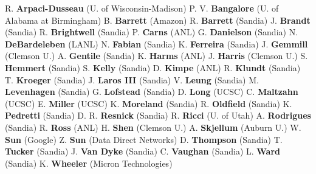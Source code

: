 R. \textbf{Arpaci-Dusseau} (U. of Wisconsin-Madison)
P. V. \textbf{Bangalore} (U. of Alabama at Birmingham)
B. \textbf{Barrett} (Amazon)
R. \textbf{Barrett} (Sandia)
J. \textbf{Brandt} (Sandia)
R. \textbf{Brightwell} (Sandia)
P. \textbf{Carns} (ANL)
G. \textbf{Danielson} (Sandia)
N. \textbf{DeBardeleben} (LANL)
N. \textbf{Fabian} (Sandia)
K. \textbf{Ferreira} (Sandia)
J. \textbf{Gemmill} (Clemson U.)
A. \textbf{Gentile} (Sandia)
K. \textbf{Harms} (ANL)
J. \textbf{Harris} (Clemson U.)
S. \textbf{Hemmert} (Sandia)
S. \textbf{Kelly} (Sandia)
D. \textbf{Kimpe} (ANL)
R. \textbf{Klundt} (Sandia)
T. \textbf{Kroeger} (Sandia)
J. \textbf{Laros III} (Sandia)
V. \textbf{Leung} (Sandia)
M. \textbf{Levenhagen} (Sandia)
G. \textbf{Lofstead} (Sandia)
D. \textbf{Long} (UCSC)
C. \textbf{Maltzahn} (UCSC)
E. \textbf{Miller} (UCSC)
K. \textbf{Moreland} (Sandia)
R. \textbf{Oldfield} (Sandia)
K. \textbf{Pedretti} (Sandia)
D. R. \textbf{Resnick} (Sandia)
R. \textbf{Ricci} (U. of Utah)
A. \textbf{Rodrigues} (Sandia)
R. \textbf{Ross} (ANL)
H. \textbf{Shen} (Clemson U.)
A. \textbf{Skjellum} (Auburn U.)
W. \textbf{Sun} (Google)
Z. \textbf{Sun} (Data Direct Networks)
D. \textbf{Thompson} (Sandia)
T. \textbf{Tucker} (Sandia)
J. \textbf{Van Dyke} (Sandia)
C. \textbf{Vaughan} (Sandia)
L. \textbf{Ward} (Sandia)
K. \textbf{Wheeler} (Micron Technologies)
